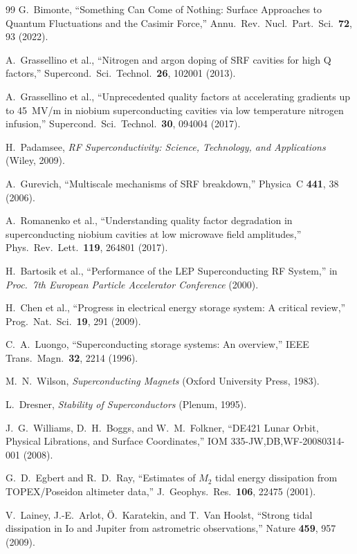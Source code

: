 \documentclass[aps,prd,twocolumn,showpacs,preprintnumbers,superscriptaddress,nofootinbib]{revtex4-2}
\begin{document}
\begin{thebibliography}{99}
G.~Bimonte, ``Something Can Come of Nothing: Surface Approaches to
Quantum Fluctuations and the Casimir Force,'' Annu.\ Rev.\ Nucl.\ Part.\
Sci.\ \textbf{72}, 93 (2022).

A.~Grassellino et al., ``Nitrogen and argon doping of SRF cavities for
high Q factors,'' Supercond.\ Sci.\ Technol.\ \textbf{26}, 102001
(2013).

A.~Grassellino et al., ``Unprecedented quality factors at accelerating
gradients up to 45~MV/m in niobium superconducting cavities via low
temperature nitrogen infusion,'' Supercond.\ Sci.\ Technol.\ \textbf{30},
094004 (2017).

H.~Padamsee, \emph{RF Superconductivity: Science, Technology, and
Applications} (Wiley, 2009).

A.~Gurevich, ``Multiscale mechanisms of SRF breakdown,'' Physica~C
\textbf{441}, 38 (2006).

A.~Romanenko et al., ``Understanding quality factor degradation in
superconducting niobium cavities at low microwave field amplitudes,''
Phys.\ Rev.\ Lett.\ \textbf{119}, 264801 (2017).

H.~Bartosik et al., ``Performance of the LEP Superconducting
RF System,'' in \emph{Proc.\ 7th European Particle Accelerator
Conference} (2000).

H.~Chen et al., ``Progress in electrical energy storage system: A
critical review,'' Prog.\ Nat.\ Sci.\ \textbf{19}, 291 (2009).

C.~A.~Luongo, ``Superconducting storage systems: An overview,'' IEEE
Trans.\ Magn.\ \textbf{32}, 2214 (1996).

M.~N.~Wilson, \emph{Superconducting Magnets} (Oxford University Press,
1983).

L.~Dresner, \emph{Stability of Superconductors} (Plenum, 1995).

J.~G.~Williams, D.~H.~Boggs, and W.~M.~Folkner, ``DE421 Lunar Orbit,
Physical Librations, and Surface Coordinates,'' IOM 335-JW,DB,WF-20080314-001
(2008).

G.~D.~Egbert and R.~D.~Ray, ``Estimates of $M_2$ tidal energy
dissipation from TOPEX/Poseidon altimeter data,'' J.\ Geophys.\ Res.\
\textbf{106}, 22475 (2001).

V.~Lainey, J.-E.~Arlot, \"O.~Karatekin, and T.~Van Hoolst,
``Strong tidal dissipation in Io and Jupiter from astrometric
observations,'' Nature \textbf{459}, 957 (2009).


\end{thebibliography}
\end{document}
